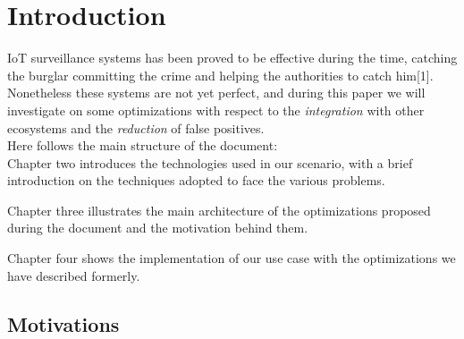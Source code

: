 \chapter{Introduction}

IoT surveillance systems has been proved to be effective during the time,
catching the burglar committing the crime and helping the authorities to
catch him[1]. Nonetheless these systems are not yet perfect, and during
this paper we will investigate on some optimizations with respect to
the \textit{integration} with other ecosystems and the \textit{reduction}
of false positives.\\
Here follows the main structure of the document:\\

Chapter two introduces the technologies used in our scenario, with a brief
introduction on the techniques adopted to face the various problems.

Chapter three illustrates the main architecture of the optimizations proposed
during the document and the motivation behind them.

Chapter four shows the implementation of our use case with the optimizations
we have described formerly.


\section{Motivations}

